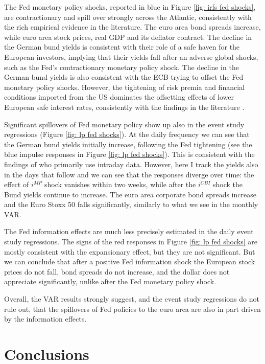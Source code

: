 \documentclass[a4paper,12pt]{article}
\begin{document}
The Fed monetary policy shocks, reported in blue in Figure \ref{fig: irfs fed shocks}, are contractionary and spill over strongly across the Atlantic, consistently with the rich empirical evidence in the literature.
The euro area bond spreads increase, while euro area stock prices, real GDP and its deflator contract. 
The decline in the German bund yields is consistent with their role of a safe haven for the European investors, implying that their yields fall after an adverse global shocks, such as the Fed's contractionary monetary policy shock. The decline in the German bund yields is also consistent with the ECB trying to offset the Fed monetary policy shocks. However, the tightening of risk premia and financial conditions imported from the US
dominates the offsetting effects of lower European safe interest rates, consistently with the findings in the literature \citep{CesaBianchi_Sokol_2022,Degasperi_etal_2021}.

Significant spillovers of Fed monetary policy show up also in the event study regressions (Figure \ref{fig: lp fed shocks}). At the daily frequency we can see that the German bund yields initially increase, following the Fed tightening (see the blue impulse responses in Figure \ref{fig: lp fed shocks}). This is consistent with the findings of \cite{Curcuru_DePooter_Eckerd_2018} who primarily use intraday data. However, here I track the yields also in the days that follow and we can see that the responses diverge over time: the effect of $i^{MP}$ shock vanishes within two weeks, while after the $i^{CBI}$ shock the Bund yields continue to increase. 
The euro area corporate bond spreads increase and the Euro Stoxx 50 falls significantly, similarly to what we see in the monthly VAR.

The Fed information effects are much less precisely estimated in the daily event study regressions. The signs of the red responses in Figure \ref{fig: lp fed shocks} are  mostly consistent
with the expansionary effect, but they are not significant. But we can conclude
that after a positive Fed information shock the European stock prices do not fall, bond spreads do not increase, and the dollar does not appreciate significantly, unlike after the Fed monetary policy shock.

Overall, the VAR results strongly suggest, and the event study regressions do not rule out, that
the spillovers of Fed policies to the euro area are also in part driven by the information effects.

\section{Conclusions}
\end{document}
